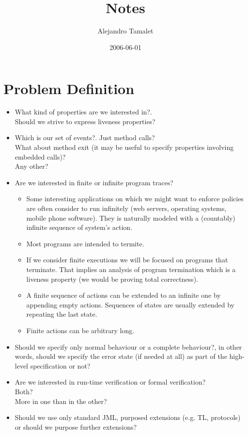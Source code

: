 \documentclass[a4paper,10pt]{article}
\author{Alejandro Tamalet}
\date{2006-06-01}
\title{Notes}
\begin{document}
\maketitle

\section{Problem Definition}
\begin{itemize}
  \item What kind of properties are we interested in?.\\
  Should we strive to express liveness properties?
  \item Which is our set of events?. Just method calls?\\
  What about method exit (it may be useful to specify properties involving
embedded calls)?\\
  Any other?
  \item Are we interested in finite or infinite program traces?
\begin{itemize}
  \item Some interesting applications on which we might want to enforce
policies are often consider to run infinitely (web servers, operating systems,
mobile phone software). They is naturally modeled with a (countably) infinite
sequence of system's action.

  \item Most programs are intended to termite.

  \item If we consider finite executions we will be focused on programs that
terminate. That implies an analysis of program termination which is a
liveness property (we would be proving total correctness).

  \item A finite sequence of actions can be extended to an infinite one by
appending empty actions. Sequences of states are usually extended by repeating
the last state.

  \item Finite actions can be arbitrary long.

\end{itemize}  
  \item Should we specify only normal behaviour or a complete behaviour?, in
other words, should we specify the error state (if needed at all) as part of the
high-level specification or not?
  \item Are we interested in run-time verification or formal verification?\\
  Both?\\
  More in one than in the other?
  \item Should we use only standard JML, purposed extensions (e.g. TL,
protocols) or should we purpose further extensions?
\end{itemize}
\end{document}
